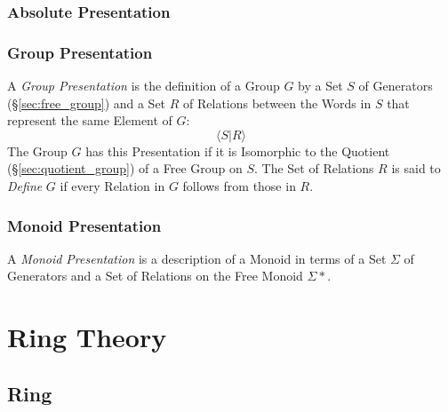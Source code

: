 \begin{itemize}
\subsubsection{Absolute Presentation}\label{sec:absolute_presentation}

\subsubsection{Group Presentation}\label{sec:group_presentation}

A \emph{Group Presentation} is the definition of a Group $G$ by a Set
$S$ of Generators (\S\ref{sec:free_group}) and a Set $R$ of Relations
between the Words in $S$ that represent the same Element of $G$:
\[
  \langle S | R \rangle
\]
The Group $G$ has this Presentation if it is Isomorphic to the
Quotient (\S\ref{sec:quotient_group}) of a Free Group on $S$. The Set
of Relations $R$ is said to \emph{Define} $G$ if every Relation in $G$
follows from those in $R$.



\subsubsection{Monoid Presentation}\label{sec:monoid_presentation}

A \emph{Monoid Presentation} is a description of a Monoid in terms of
a Set $\Sigma$ of Generators and a Set of Relations on the Free Monoid
$\Sigma*$.



\section{Ring Theory}\label{sec:ring_theory}

\subsection{Ring}\label{sec:ring}


\end{itemize}
